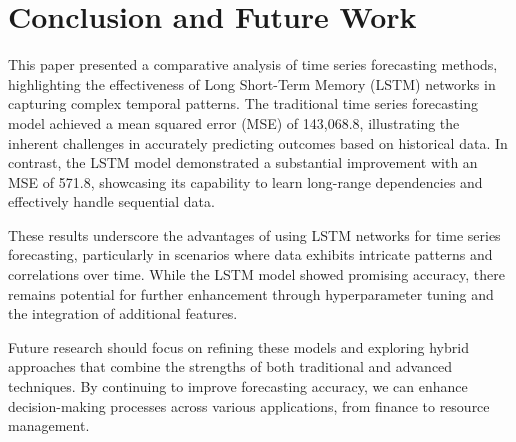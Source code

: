 \documentclass[a4paper,12pt]{article}
\begin{document}
\section{Conclusion and Future Work}
This paper presented a comparative analysis of time series forecasting methods, highlighting the effectiveness of Long Short-Term Memory (LSTM) networks in capturing complex temporal patterns. The traditional time series forecasting model achieved a mean squared error (MSE) of 143,068.8, illustrating the inherent challenges in accurately predicting outcomes based on historical data. In contrast, the LSTM model demonstrated a substantial improvement with an MSE of 571.8, showcasing its capability to learn long-range dependencies and effectively handle sequential data.

These results underscore the advantages of using LSTM networks for time series forecasting, particularly in scenarios where data exhibits intricate patterns and correlations over time. While the LSTM model showed promising accuracy, there remains potential for further enhancement through hyperparameter tuning and the integration of additional features.

Future research should focus on refining these models and exploring hybrid approaches that combine the strengths of both traditional and advanced techniques. By continuing to improve forecasting accuracy, we can enhance decision-making processes across various applications, from finance to resource management.
\end{document}
